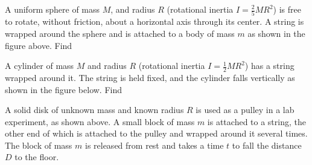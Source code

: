 \documentclass{../../oss-apphys-exam}
\newcounter{lastmc}
\begin{document}
\begin{questions}
  \setcounter{question}{\value{lastmc}}
  
  \question A uniform sphere of mass $M$, and radius $R$ (rotational inertia
  $I=\frac25MR^2$) is free to rotate, without friction, about a horizontal axis
  through its center. A string is wrapped around the sphere and is attached to
  a body of mass $m$ as shown in the figure above. Find
  \newpage

  \question A cylinder of mass $M$ and radius $R$ (rotational inertia
  $I=\frac12MR^2$) has a string wrapped around it. The string is held fixed,
  and the cylinder falls vertically as shown in the figure below. Find
  \begin{center}
  \end{center}
  \newpage


  \question A solid disk of unknown mass and known radius $R$ is used as a
  pulley in a lab experiment, as shown above. A small block of mass $m$ is
  attached to a string, the other end of which is attached to the pulley and
  wrapped around it several times. The block of mass $m$ is released from rest
  and takes a time $t$ to fall the distance $D$ to the floor.
  \begin{parts}

\end{parts}
\end{questions}
\end{document}

